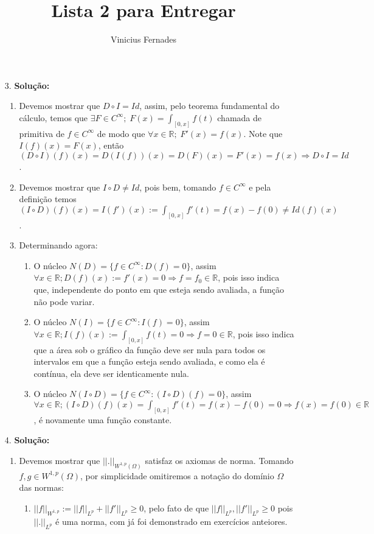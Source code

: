 \documentclass{article}
\begin{document}
	
	\title{Lista 2 para Entregar}
	\author{Vinicius Fernades}
	
	\maketitle
	
	\begin{enumerate}
		\item[3.] \textbf{Solução:}
		\begin{enumerate}
			\item Devemos mostrar que $D\circ I = Id$, assim, pelo teorema fundamental do cálculo, temos que $\exists F \in C^{\infty}; \; F(x) = \int_{[0,x]}f(t)$ chamada de primitiva de $f \in C^{\infty}$ de modo que $\forall x \in \mathbb{R}; \; F'(x) = f(x)$. Note que $I(f)(x) = F(x)$, então $(D\circ I)(f)(x) = D(I(f))(x) = D(F)(x) = F'(x) = f(x) \Rightarrow D\circ I = Id$.
			
			\item Devemos mostrar que $I \circ D \neq Id$, pois bem, tomando $f \in C^{\infty}$ e pela definição temos $(I \circ D) (f)(x) = I(f')(x) := \int_{[0,x]}f'(t) = f(x)-f(0) \neq Id(f)(x)$.
			
			\item Determinando agora:
				\begin{enumerate}
					\item O núcleo $N(D)=\{f \in C^{\infty}: D(f)=0 \}$, assim $\forall x  \in \mathbb{R}; D(f)(x) := f'(x) =0 \Rightarrow f = f_{0} \in \mathbb{R}$, pois isso indica que, independente do ponto em que esteja sendo avaliada, a função não pode variar.
					
					\item O núcleo $N(I)=\{f \in C^{\infty}: I(f)=0 \}$, assim $\forall x  \in \mathbb{R}; I(f)(x) := \int_{[0,x]}f(t) =0 \Rightarrow f = 0 \in \mathbb{R}$, pois isso indica que a área sob o gráfico da função deve ser nula para todos os intervalos em que a função esteja sendo avaliada, e como ela é contínua, ela deve ser identicamente nula.
					
					\item O núcleo $N(I\circ D)=\{f \in C^{\infty}: (I\circ D)(f)=0 \}$, assim $\forall x  \in \mathbb{R}; (I\circ D)(f)(x) = \int_{[0,x]}f'(t) = f(x) - f(0) = 0 \Rightarrow f(x) = f(0) \in \mathbb{R}$, é novamente uma função constante.
				\end{enumerate}
		\end{enumerate}
		
		\item[4.] \textbf{Solução:}
			\begin{enumerate}
				\item Devemos mostrar que $||.||_{W^{1,p}(\Omega)}$ satisfaz os axiomas de norma. Tomando $f, g \in W^{1,p}(\Omega)$, por simplicidade omitiremos a notação do domínio $\Omega$ das normas:
				\begin{enumerate}
					\item $||f||_{W^{1,p}} := ||f||_{L^{p}} + ||f'||_{L^{p}} \geq 0$, pelo fato de que $||f||_{L^{p}}, ||f'||_{L^{p}} \geq 0$ pois $||.||_{L^{p}}$ é uma norma, com já foi demonstrado em exercícios anteiores.
					

\end{enumerate}
\end{enumerate}
\end{enumerate}
\end{document}
